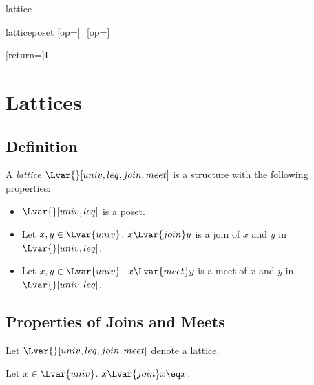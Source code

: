 \documentclass{stex}
\begin{document}
\begin{smodule}{lattice}

\begin{extstructure}{lattice}{poset}
  [op=\vee]{\,\vee\,}
  [op=\wedge]{\,\wedge\,}
\end{extstructure}

[return={\lattice[comp=##1]}]{\mathcal L}

\section{Lattices}

\begin{forthel}
\end{forthel}

\subsection{Definition}

\begin{signature*}[forthel,id=LatticeSig,printid]
  A \emph{lattice $\Lvar{}[univ,leq,join,meet]$} is a structure with the following properties:
  
  \begin{itemize}
    \item\label{latticeSig}
      $\Lvar{}[univ,leq]$ is a poset.
    \item\label{latticeJoinSig}
      Let $x,y\in\Lvar{univ}$.
      $x{\Lvar{join}}y$ is a join of $x$ and $y$ in $\Lvar{}[univ,leq]$.
    \item\label{latticeMeetSig}
      Let $x,y\in\Lvar{univ}$.
      $x{\Lvar{meet}}y$ is a meet of $x$ and $y$ in $\Lvar{}[univ,leq]$.
  \end{itemize}
\end{signature*}

\subsection{Properties of Joins and Meets}

\begin{forthel}
  Let $\Lvar{}[univ,leq,join,meet]$ denote a lattice.
\end{forthel}

\begin{proposition*}[forthel,id=JoinIdempotenceThm,printid]
  Let $x\in\Lvar{univ}$.
  $x{\Lvar{join}}x\eq x$.
\end{proposition*}


\end{smodule}
\end{document}
